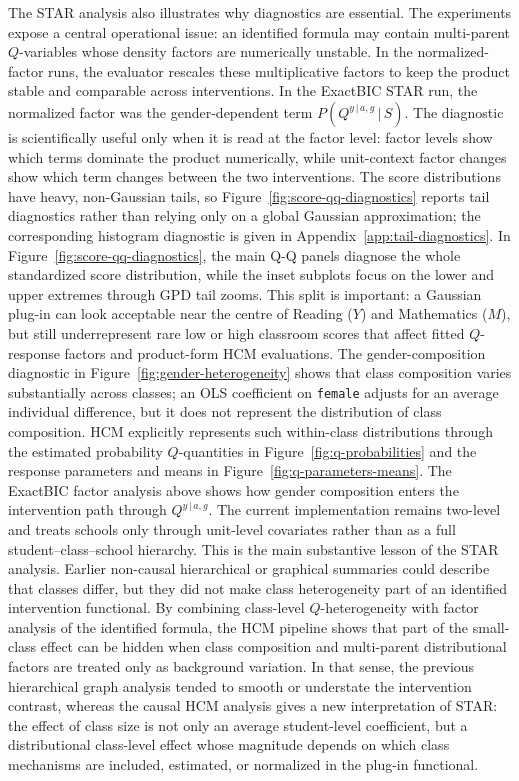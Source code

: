 \documentclass[unnumsec,webpdf,contemporary,large]{oup-authoring-template}%
\theoremstyle{thmstyleone}%
\theoremstyle{thmstyletwo}%
\theoremstyle{thmstylethree}%
\newcommand{\g}{\,\vert\,}
\begin{document}
The STAR analysis also illustrates why diagnostics are essential.
The experiments expose a central operational issue: an identified formula may contain multi-parent $Q$-variables whose density factors are numerically unstable.
In the normalized-factor runs, the evaluator rescales these multiplicative factors to keep the product stable and comparable across interventions.
In the ExactBIC STAR run, the normalized factor was the gender-dependent term $P(Q^{y\g a,g}\g S)$.
The diagnostic is scientifically useful only when it is read at the factor level: factor levels show which terms dominate the product numerically, while unit-context factor changes show which term changes between the two interventions.
The score distributions have heavy, non-Gaussian tails, so Figure~\ref{fig:score-qq-diagnostics} reports tail diagnostics rather than relying only on a global Gaussian approximation; the corresponding histogram diagnostic is given in Appendix~\ref{app:tail-diagnostics}.
In Figure~\ref{fig:score-qq-diagnostics}, the main Q-Q panels diagnose the whole standardized score distribution, while the inset subplots focus on the lower and upper extremes through GPD tail zooms.
This split is important: a Gaussian plug-in can look acceptable near the centre of Reading ($Y$) and Mathematics ($M$), but still underrepresent rare low or high classroom scores that affect fitted $Q$-response factors and product-form HCM evaluations.
The gender-composition diagnostic in Figure~\ref{fig:gender-heterogeneity} shows that class composition varies substantially across classes; an OLS coefficient on \texttt{female} adjusts for an average individual difference, but it does not represent the distribution of class composition.
HCM explicitly represents such within-class distributions through the estimated probability $Q$-quantities in Figure~\ref{fig:q-probabilities} and the response parameters and means in Figure~\ref{fig:q-parameters-means}.
The ExactBIC factor analysis above shows how gender composition enters the intervention path through $Q^{y\g a,g}$.
The current implementation remains two-level and treats schools only through unit-level covariates rather than as a full student--class--school hierarchy.
This is the main substantive lesson of the STAR analysis.
Earlier non-causal hierarchical or graphical summaries could describe that classes differ, but they did not make class heterogeneity part of an identified intervention functional.
By combining class-level $Q$-heterogeneity with factor analysis of the identified formula, the HCM pipeline shows that part of the small-class effect can be hidden when class composition and multi-parent distributional factors are treated only as background variation.
In that sense, the previous hierarchical graph analysis tended to smooth or understate the intervention contrast, whereas the causal HCM analysis gives a new interpretation of STAR: the effect of class size is not only an average student-level coefficient, but a distributional class-level effect whose magnitude depends on which class mechanisms are included, estimated, or normalized in the plug-in functional.
\end{document}
